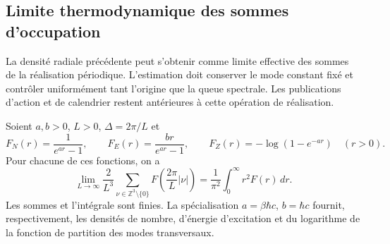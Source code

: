 \subsection{Limite thermodynamique des sommes d’occupation}
\label{v:v:subsec:limite-termodinamico}

La densité radiale précédente peut s’obtenir comme limite effective des
sommes de la réalisation périodique. L’estimation doit conserver le mode
constant fixé et contrôler uniformément tant l’origine que la queue
spectrale. Les publications d’action et de calendrier restent antérieures
à cette opération de réalisation.

\begin{lemma}
\label{v:v:lem:limite-termodinamico}
Soient \(a,b>0\), \(L>0\), \(\Delta=2\pi/L\) et
\[
 F_N(r)=\frac{1}{e^{ar}-1},\qquad
 F_E(r)=\frac{br}{e^{ar}-1},\qquad
 F_Z(r)=-\log(1-e^{-ar})\quad(r>0).
\]
Pour chacune de ces fonctions, on a
\begin{equation}
 \lim_{L\to\infty}\frac{2}{L^3}
 \sum_{\nu\in\mathbb Z^3\setminus\{0\}}
 F\!\left(\frac{2\pi}{L}|\nu|\right)
 =\frac{1}{\pi^2}\int_0^\infty r^2F(r)\,dr.
 \label{v:v:eq:limite-modos-discretos}
\end{equation}
Les sommes et l’intégrale sont finies. La spécialisation
\(a=\beta\hbar c\), \(b=\hbar c\) fournit, respectivement,
les densités de nombre, d’énergie d’excitation et du logarithme de la fonction
de partition des modes transversaux.
\end{lemma}

